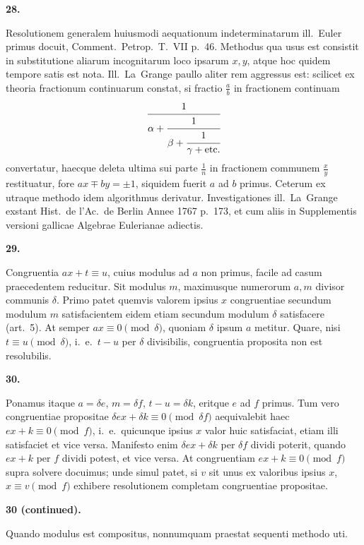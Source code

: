 \documentclass[12pt,a4paper]{article}
\theoremstyle{plain}
\theoremstyle{definition}
\theoremstyle{remark}
\begin{document}
\textbf{28.}

Resolutionem generalem huiusmodi aequationum indeterminatarum ill.\ Euler primus docuit, Comment.\ Petrop.\ T.~VII p.~46. Methodus qua usus est consistit in substitutione aliarum incognitarum loco ipsarum $x, y$, atque hoc quidem tempore satis est nota. Ill.\ La~Grange paullo aliter rem aggressus est: scilicet ex theoria fractionum continuarum constat, si fractio $\frac{a}{b}$ in fractionem continuam
\[
\cfrac{1}{\alpha + \cfrac{1}{\beta + \cfrac{1}{\gamma + \text{etc.}}}}
\]
convertatur, haecque deleta ultima sui parte $\frac{1}{n}$ in fractionem communem $\frac{x}{y}$ restituatur, fore $ax \mp by = \pm 1$, siquidem fuerit $a$ ad $b$ primus. Ceterum ex utraque methodo idem algorithmus derivatur. Investigationes ill.\ La~Grange exstant Hist.\ de l'Ac.\ de Berlin Annee 1767 p.~173, et cum aliis in Supplementis versioni gallicae Algebrae Eulerianae adiectis.

\textbf{29.}

Congruentia $ax + t \equiv u$, cuius modulus ad $a$ non primus, facile ad casum praecedentem reducitur. Sit modulus $m$, maximusque numerorum $a, m$ divisor communis $\delta$. Primo patet quemvis valorem ipsius $x$ congruentiae secundum modulum $m$ satisfacientem eidem etiam secundum modulum $\delta$ satisfacere (art.~5). At semper $ax \equiv 0 \pmod{\delta}$, quoniam $\delta$ ipsum $a$ metitur. Quare, nisi $t \equiv u \pmod{\delta}$, i.~e.\ $t - u$ per $\delta$ divisibilis, congruentia proposita non est resolubilis.

\textbf{30.}

Ponamus itaque $a = \delta e$, $m = \delta f$, $t - u = \delta k$, eritque $e$ ad $f$ primus. Tum vero congruentiae propositae $\delta ex + \delta k \equiv 0 \pmod{\delta f}$ aequivalebit haec $ex + k \equiv 0 \pmod{f}$, i.~e.\ quicunque ipsius $x$ valor huic satisfaciat, etiam illi satisfaciet et vice versa. Manifesto enim $\delta ex + \delta k$ per $\delta f$ dividi poterit, quando $ex + k$ per $f$ dividi potest, et vice versa. At congruentiam $ex + k \equiv 0 \pmod{f}$ supra solvere docuimus; unde simul patet, si $v$ sit unus ex valoribus ipsius $x$, $x \equiv v \pmod{f}$ exhibere resolutionem completam congruentiae propositae.

\textbf{30 \textnormal{(continued).}}

Quando modulus est compositus, nonnumquam praestat sequenti methodo uti.
\end{document}
